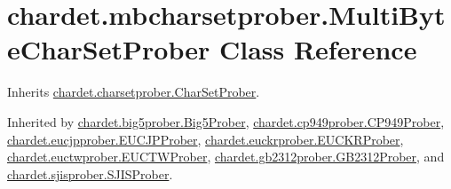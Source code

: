 \hypertarget{classchardet_1_1mbcharsetprober_1_1_multi_byte_char_set_prober}{}\section{chardet.\+mbcharsetprober.\+Multi\+Byte\+Char\+Set\+Prober Class Reference}
\label{classchardet_1_1mbcharsetprober_1_1_multi_byte_char_set_prober}


Inherits \hyperlink{classchardet_1_1charsetprober_1_1_char_set_prober}{chardet.\+charsetprober.\+Char\+Set\+Prober}.



Inherited by \hyperlink{classchardet_1_1big5prober_1_1_big5_prober}{chardet.\+big5prober.\+Big5\+Prober}, \hyperlink{classchardet_1_1cp949prober_1_1_c_p949_prober}{chardet.\+cp949prober.\+C\+P949\+Prober}, \hyperlink{classchardet_1_1eucjpprober_1_1_e_u_c_j_p_prober}{chardet.\+eucjpprober.\+E\+U\+C\+J\+P\+Prober}, \hyperlink{classchardet_1_1euckrprober_1_1_e_u_c_k_r_prober}{chardet.\+euckrprober.\+E\+U\+C\+K\+R\+Prober}, \hyperlink{classchardet_1_1euctwprober_1_1_e_u_c_t_w_prober}{chardet.\+euctwprober.\+E\+U\+C\+T\+W\+Prober}, \hyperlink{classchardet_1_1gb2312prober_1_1_g_b2312_prober}{chardet.\+gb2312prober.\+G\+B2312\+Prober}, and \hyperlink{classchardet_1_1sjisprober_1_1_s_j_i_s_prober}{chardet.\+sjisprober.\+S\+J\+I\+S\+Prober}.

